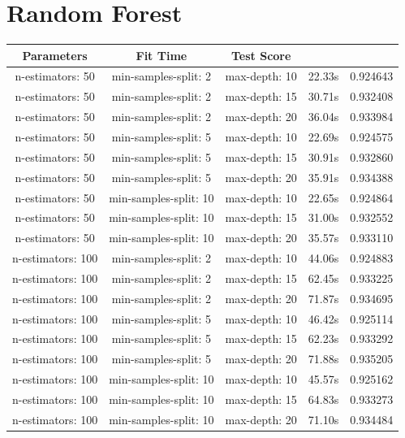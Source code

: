 \documentclass{article}
\begin{document}
\section{Random Forest}
\begin{tabular}{|c c c | c c|}
  \hline  
  Parameters & Fit Time & Test Score \\ [0.5ex] 
  \hline
n-estimators: 50 & min-samples-split: 2 & max-depth: 10 & 22.33s & 0.924643 \\
n-estimators: 50 & min-samples-split: 2 & max-depth: 15 & 30.71s & 0.932408 \\
n-estimators: 50 & min-samples-split: 2 & max-depth: 20 & 36.04s & 0.933984 \\ 
\hline
n-estimators: 50 & min-samples-split: 5 & max-depth: 10 & 22.69s & 0.924575 \\
n-estimators: 50 & min-samples-split: 5 & max-depth: 15 & 30.91s & 0.932860 \\
n-estimators: 50 & min-samples-split: 5 & max-depth: 20 & 35.91s & 0.934388 \\ 
\hline
n-estimators: 50 & min-samples-split: 10 & max-depth: 10 & 22.65s & 0.924864 \\
n-estimators: 50 & min-samples-split: 10 & max-depth: 15 & 31.00s & 0.932552 \\
n-estimators: 50 & min-samples-split: 10 & max-depth: 20 & 35.57s & 0.933110 \\ 
\hline
\hline
n-estimators: 100 & min-samples-split: 2 & max-depth: 10 & 44.06s & 0.924883 \\
n-estimators: 100 & min-samples-split: 2 & max-depth: 15 & 62.45s & 0.933225 \\
n-estimators: 100 & min-samples-split: 2 & max-depth: 20 & 71.87s & 0.934695 \\ 
\hline
n-estimators: 100 & min-samples-split: 5 & max-depth: 10 & 46.42s & 0.925114 \\
n-estimators: 100 & min-samples-split: 5 & max-depth: 15 & 62.23s & 0.933292 \\
n-estimators: 100 & min-samples-split: 5 & max-depth: 20 & 71.88s & 0.935205 \\ 
\hline
n-estimators: 100 & min-samples-split: 10 & max-depth: 10 & 45.57s & 0.925162 \\
n-estimators: 100 & min-samples-split: 10 & max-depth: 15 & 64.83s & 0.933273 \\
n-estimators: 100 & min-samples-split: 10 & max-depth: 20 & 71.10s & 0.934484 \\
\end{tabular}
\end{document}

